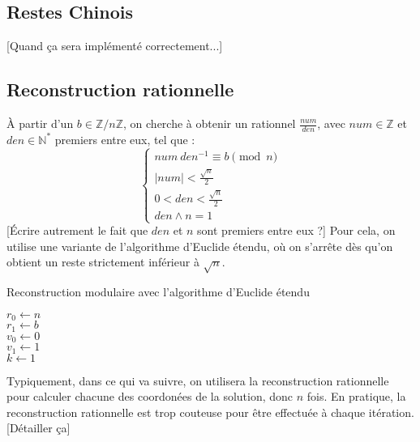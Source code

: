 \documentclass[french]{article}
\begin{document}
\subsection{Restes Chinois}
[Quand ça sera implémenté correctement...]
\subsection{Reconstruction rationnelle}
À partir d'un $b \in \mathbb{Z}/n\mathbb{Z}$, on cherche à obtenir un rationnel $\frac{num}{den}$, avec $num \in \mathbb{Z}$ et $den \in \mathbb{N}^*$ premiers entre eux, tel que :
\begin{equation*}
	\begin{cases}
		num \  den^{-1} \equiv b \pmod n\\
		\lvert num \rvert < \frac{\sqrt{n}}{2}\\
		0 < den < \frac{\sqrt{n}}{2}\\
		den \wedge n = 1
	\end{cases}
\end{equation*}
[Écrire autrement le fait que $den$ et $n$ sont premiers entre eux ?]
\newline
Pour cela, on utilise une variante de l'algorithme d'Euclide étendu, où on s'arrête dès qu'on obtient un reste strictement inférieur à $\sqrt{n}$.\newline\newline
\begin{algorithm}[H]
	\DontPrintSemicolon
	\caption{Reconstruction modulaire avec l'algorithme d'Euclide étendu}
	$r_0 \gets n$\\
	$r_1 \gets b$\\
	$v_0 \gets 0$\\
	$v_1 \gets 1$\\
	$k \gets 1$\\
\end{algorithm}
\leavevmode \newline
Typiquement, dans ce qui va suivre, on utilisera la reconstruction rationnelle pour calculer chacune des coordonées de la solution, donc $n$ fois.
 En pratique, la reconstruction rationnelle est trop couteuse pour être effectuée à chaque itération.  [Détailler ça]
\end{document}
